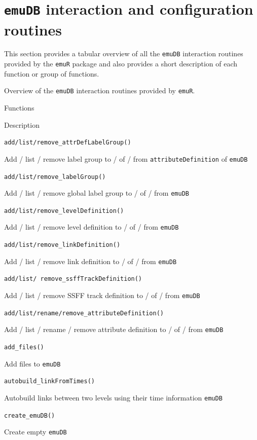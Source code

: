 \documentclass[]{book}
\begin{document}
\hypertarget{sec:emuRpackageDetails-emuDBinteract}{%
\section{\texorpdfstring{\texttt{emuDB} interaction and configuration routines}{emuDB interaction and configuration routines}}\label{sec:emuRpackageDetails-emuDBinteract}}

This section provides a tabular overview of all the \texttt{emuDB} interaction routines provided by the \texttt{emuR} package and also provides a short description of each function or group of functions.

\label{tab:emuRpackageDetails-emuDBinteract}Overview of the \texttt{emuDB} interaction routines provided by \texttt{emuR}.

Functions

Description

\texttt{add/list/remove\_attrDefLabelGroup()}

Add / list / remove label group to / of / from \texttt{attributeDefinition} of \texttt{emuDB}

\texttt{add/list/remove\_labelGroup()}

Add / list / remove global label group to / of / from \texttt{emuDB}

\texttt{add/list/remove\_levelDefinition()}

Add / list / remove level definition to / of / from \texttt{emuDB}

\texttt{add/list/remove\_linkDefinition()}

Add / list / remove link definition to / of / from \texttt{emuDB}

\texttt{add/list/\ remove\_ssffTrackDefinition()}

Add / list / remove SSFF track definition to / of / from \texttt{emuDB}

\texttt{add/list/rename/remove\_attributeDefinition()}

Add / list / rename / remove attribute definition to / of / from \texttt{emuDB}

\texttt{add\_files()}

Add files to \texttt{emuDB}

\texttt{autobuild\_linkFromTimes()}

Autobuild links between two levels using their time information \texttt{emuDB}

\texttt{create\_emuDB()}

Create empty \texttt{emuDB}
\end{document}
